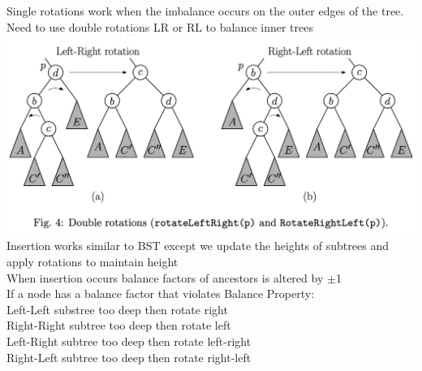\documentclass{article}
\begin{document}
  Single rotations work when the imbalance occurs on the outer edges of the tree. Need to use double rotations LR or RL to balance inner trees \\
  \includegraphics[width=\textwidth]{FibTreeDoubleRotation}
  Insertion works similar to BST except we update the heights of subtrees and apply rotations to maintain height \\
  When insertion occurs balance factors of ancestors is altered by $\pm$1\\
  If a node has a balance factor that violates Balance Property: \\
  \indent Left-Left substree too deep then rotate right \\
  \indent Right-Right subtree too deep then rotate left \\
  \indent Left-Right subtree too deep then rotate left-right \\
  \indent Right-Left subtree too deep then rotate right-left
\end{document}
